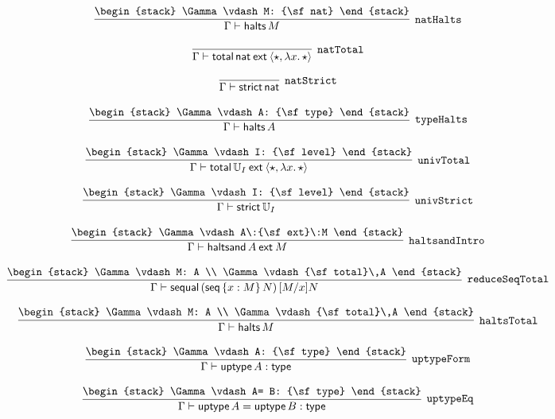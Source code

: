 \[
\infer[{\tt natHalts}]{\Gamma \vdash {\sf halts}\,M}{
\begin{stack}
\Gamma \vdash M: {\sf nat}
\end{stack}}
\]

\[
\infer[{\tt natTotal}]{\Gamma \vdash {\sf total}\,{\sf nat}\:{\sf ext}\:\langle \star ,\lambda x.\,\star \rangle }{}
\]

\[
\infer[{\tt natStrict}]{\Gamma \vdash {\sf strict}\,{\sf nat}}{}
\]

\[
\infer[{\tt typeHalts}]{\Gamma \vdash {\sf halts}\,A}{
\begin{stack}
\Gamma \vdash A: {\sf type}
\end{stack}}
\]

\[
\infer[{\tt univTotal}]{\Gamma \vdash {\sf total}\,{\Bbb U}_{I}\:{\sf ext}\:\langle \star ,\lambda x.\,\star \rangle }{
\begin{stack}
\Gamma \vdash I: {\sf level}
\end{stack}}
\]

\[
\infer[{\tt univStrict}]{\Gamma \vdash {\sf strict}\,{\Bbb U}_{I}}{
\begin{stack}
\Gamma \vdash I: {\sf level}
\end{stack}}
\]

\[
\infer[{\tt haltsandIntro}]{\Gamma \vdash {\sf haltsand}\,A\:{\sf ext}\:M}{
\begin{stack}
\Gamma \vdash A\:{\sf ext}\:M
\end{stack}}
\]

\[
\infer[{\tt reduceSeqTotal}]{\Gamma \vdash {\sf sequal}\,({\sf seq}\,\{x : M\}\,N)\,[M/x]N}{
\begin{stack}
\Gamma \vdash M: A
\\
\Gamma \vdash {\sf total}\,A
\end{stack}}
\]

\[
\infer[{\tt haltsTotal}]{\Gamma \vdash {\sf halts}\,M}{
\begin{stack}
\Gamma \vdash M: A
\\
\Gamma \vdash {\sf total}\,A
\end{stack}}
\]

\[
\infer[{\tt uptypeForm}]{\Gamma \vdash {\sf uptype}\,A: {\sf type}}{
\begin{stack}
\Gamma \vdash A: {\sf type}
\end{stack}}
\]

\[
\infer[{\tt uptypeEq}]{\Gamma \vdash {\sf uptype}\,A= {\sf uptype}\,B: {\sf type}}{
\begin{stack}
\Gamma \vdash A= B: {\sf type}
\end{stack}}
\]

